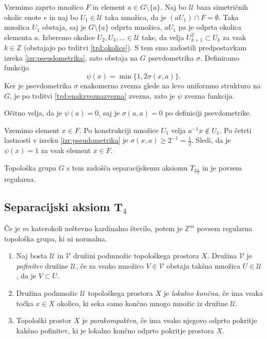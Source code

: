 \documentclass[mat1]{fmfdelo}
\newcommand{\Z}{\mathbb Z}
\newcommand{\Ucurl}{\mathcal{U}}
\begin{document}
\begin{dokaz}
Vzemimo zaprto množico $F$ in element $a \in G\setminus\lbrace a \rbrace$.
Naj bo $\Ucurl$ baza simetričnih okolic enote $e$ in naj bo $U_1 \in \Ucurl$ taka množica, da je $(aU_1)\cap F = \emptyset$. Taka množica $U_1$ obstaja, saj je $G\setminus\lbrace a \rbrace$ odprta množica, $aU_1$ pa je odprta okolica elementa $a$. Izberemo okolice $U_2, U_3,... \in \Ucurl$ take, da velja $U_{k+1}^2 \subset U_k$ za vsak $k \in \Z$ (obstajajo po trditvi \ref{trd:okolice}). S tem smo zadostili predpostavkam izreka \ref{izr:pseudometrika}, zato obstaja na $G$ psevdometrika $\sigma$. Definiramo funkcijo \[ \psi(x) = \min\lbrace 1, 2\sigma(x, a)\rbrace. \] Ker je psevdometrika $\sigma$ enakomerno zvezna glede na levo uniformno strukturo na $G$, je po trditvi \ref{trd:enakzveznazvezna} zvezna, zato je $\psi$ zvezna funkcija.

Očitno velja, da je $\psi(a) = 0$, saj je $\sigma(a, a) = 0$ po definiciji psevdometrike.

Vzemimo element $x \in F$. Po konstrukciji množice $U_1$ velja $a^{-1}x \notin U_1$. Po četrti lastnosti v izreku \ref{izr:pseudometrika} je $\sigma(x, a) \geq 2^{-1} = \frac{1}{2}$. Sledi, da je $\psi(x) = 1$ za vsak element $x \in F$.

Topološka grupa $G$ s tem zadošča separacijskemu aksiomu $T_{3\frac{1}{2}}$ in je povsem regularna.
\end{dokaz}

\subsection{Separacijski aksiom T$_4$}
\begin{izrek}\label{izr:t4protiprimer}
	Če je $m$ katerokoli neštevno kardinalno število, potem je $\Z^{m}$ povsem regularna topološka grupa, ki ni normalna.
\end{izrek}

\begin{definicija}\label{def:parakompakt}
	\begin{enumerate}
		\item Naj bosta $\mathcal{U}$ in $\mathcal{V}$ družini podmnožic topološkega prostora $X$. Družina $\mathcal{V}$ je \emph{pofinitev} družine $\mathcal{U}$, če za vsako množico $V \in \mathcal{V}$ obstaja takšna množica $U \in \mathcal{U}$, da je $V \subset U$.
		\item Družina podmnožic $\mathcal{U}$ topološkega prostora $X$ je \emph{lokalno končna}, če ima vsaka točka $x \in X$ okolico, ki seka samo končno mnogo množic iz družine $\mathcal{U}$.
		\item Topološki prostor $X$ je \emph{parakompakten}, če ima vsako njegovo odprto pokritje kakšno pofinitev, ki je lokalno končno odprto pokritje prostora $X$.
	\end{enumerate}
\end{definicija}
\end{document}
